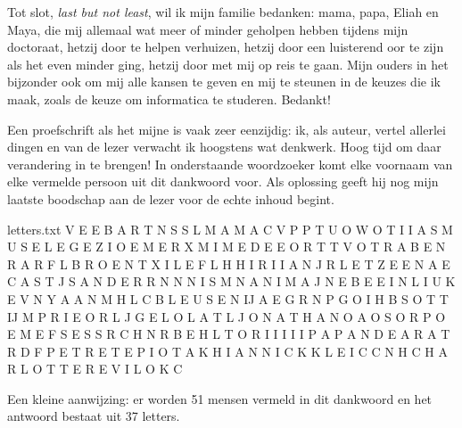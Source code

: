 \documentclass[main]{subfiles}
\begin{document}
Tot slot, \textit{last but not least}, wil ik mijn familie bedanken: mama, papa, Eliah en Maya, die mij allemaal wat meer of minder geholpen hebben tijdens mijn doctoraat, hetzij door te helpen verhuizen, hetzij door een luisterend oor te zijn als het even minder ging, hetzij door met mij op reis te gaan.
Mijn ouders in het bijzonder ook om mij alle kansen te geven en mij te steunen in de keuzes die ik maak, zoals de keuze om informatica te studeren.
Bedankt!

\pagebreak

Een proefschrift als het mijne is vaak zeer eenzijdig: ik, als auteur, vertel allerlei dingen en van de lezer verwacht ik hoogstens wat denkwerk.
Hoog tijd om daar verandering in te brengen!
In onderstaande woordzoeker komt elke voornaam van elke vermelde persoon uit dit dankwoord voor.
Als oplossing geeft hij nog mijn laatste boodschap aan de lezer voor de echte inhoud begint.

\begin{filecontents*}[overwrite]{letters.txt}
V E E B A R T N S S L M A M A C V
P P T U O W O T I I A S M U S E L
E G E Z I O E M E R X M I M E D E
E O R T T V O T R A B E N R A R F
L B R O E N T X I L E F L H H I R
I I A N J R L E T Z E E N A E C A
S T J S A N D E R R N N N I S M N
A N I M A J N E B E E I N L I U K
E V N Y A A N M H L C B L E U S E
N IJ A E G R N P G O I H B S O T T
IJ M P R I E O R L J G E L O L A T
L J O N A T H A N O A O S O R P O
E M E F S E S S R C H N R B E H L
T O R I I I I I P A P A N D E A R
A T R D F P E T R E T E P I O T A
K H I A N N I C K K L E I C C N H
C H A R L O T T E R E V I L O K C
\end{filecontents*}

\readarray*{}

\vspace{\fill}

\begin{wide}
\end{wide}

{\small Een kleine aanwijzing: er worden 51 mensen vermeld in dit dankwoord en het antwoord bestaat uit 37 letters.}



\end{document}
